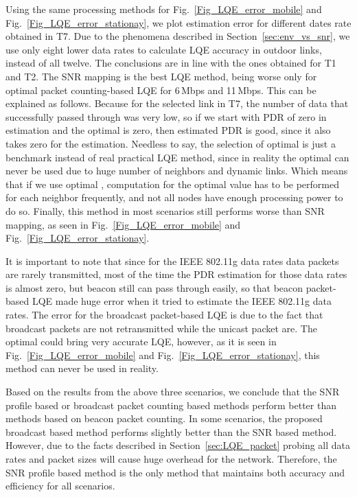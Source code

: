 \documentclass[11pt,draftclsnofoot,journal,onecolumn]{IEEEtran}
\begin{document}
Using the same processing methods for Fig.~\ref{Fig_LQE_error_mobile} and Fig.~\ref{Fig_LQE_error_stationay}, we plot estimation error  for different dates rate obtained in T7. Due to the phenomena described in Section~\ref{sec:env_vs_snr}, we use only eight lower data rates to calculate LQE accuracy in outdoor links, instead of all twelve. The conclusions are in line with the ones obtained for T1 and T2. The SNR mapping is the best LQE method, being worse only for optimal packet counting-based LQE for 6\,Mbps and 11\,Mbps. This can be explained as follows. Because for the selected link in T7, the number of data that successfully passed through was very low, so if we start with PDR of zero in estimation and the optimal  is zero, then estimated PDR is good, since it also takes zero for the estimation. Needless to say, the selection of optimal  is just a benchmark instead of real practical LQE method, since in reality the optimal  can never be used due to huge number of neighbors and dynamic links. Which means that if we use optimal ,  computation for the optimal value has to be performed for each neighbor frequently, and not all nodes have enough processing power to do so. Finally, this method in most scenarios still performs worse than SNR mapping, as seen in Fig.~\ref{Fig_LQE_error_mobile} and Fig.~\ref{Fig_LQE_error_stationay}.

It is important to note that since for the IEEE 802.11g data rates data packets are rarely transmitted, most of the time the PDR estimation for those data rates is almost zero, but beacon still can pass through easily, so that beacon packet-based LQE made huge error when it tried to estimate the IEEE 802.11g data rates. The error for the broadcast packet-based LQE is due to the fact that broadcast packets are not retransmitted while the unicast packet are. The optimal  could bring very accurate LQE, however, as it is seen in Fig.~\ref{Fig_LQE_error_mobile} and Fig.~\ref{Fig_LQE_error_stationay}, this method can never be used in reality.

Based on the results from the above three scenarios, we conclude that the SNR profile based or broadcast packet counting based methods perform better than methods based on beacon packet counting. In some scenarios, the proposed broadcast based method performs slightly better than the SNR based method. However, due to the facts described in Section~\ref{sec:LQE_packet} probing all data rates and packet sizes will cause huge overhead for the network. Therefore, the SNR profile based method is the only method that maintains both accuracy and efficiency for all scenarios.
\end{document}
